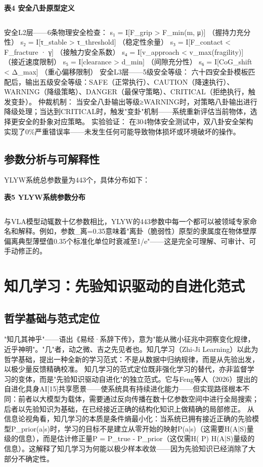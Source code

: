 \documentclass[12pt,a4paper]{article}
\begin{document}
\begin{center}
\textbf{表4  安全八卦原型定义}
\begin{tabular}{lcccc}
\hline
\end{tabular}
\end{center}
安全L2层——6条物理安全检查：
s₁ = I[F\_grip > F\_min(m, μ)]  （握持力充分性）
s₂ = I[τ\_stable > τ\_threshold]  （稳定性余量）
s₃ = I[F\_contact < F\_fracture · γ]  （接触力安全系数）
s₄ = I[v\_approach < v\_max(fragility)]  （接近速度限制）
s₅ = I[clearance > d\_min]  （间隙充分性）
s₆ = I[CoG\_shift < Δ\_max]  （重心偏移限制）
安全L3层——5级安全等级：
六十四安全卦模板匹配后，输出五级安全等级：SAFE（正常执行）、CAUTION（降速执行）、WARNING（降级策略）、DANGER（最保守策略）、CRITICAL（拒绝执行，触发变卦）。
仲裁机制： 当安全八卦输出等级≥WARNING时，对策略八卦输出进行降级处理；当达到CRITICAL时，触发"变卦"机制——系统重新评估当前物体，选择更安全的卦象对应策略。
实验验证： 在304物体安全测试中，双八卦安全架构实现了0\%严重错误率——未发生任何可能导致物体损坏或环境破坏的操作。

\subsection{参数分析与可解释性}
YLYW系统总参数量为443个，具体分布如下：

\begin{center}
\textbf{表5  YLYW系统参数分布}
\begin{tabular}{lcccc}
\hline
\end{tabular}
\end{center}
与VLA模型动辄数十亿参数相比，YLYW的443参数中每一个都可以被领域专家命名和解释。例如，参数\_离=0.35意味着"离卦（脆弱性）原型的隶属度在物体壁厚偏离典型薄壁值0.35个标准化单位时衰减至1/e"——这是完全可理解、可审计、可手动修正的。

\section{知几学习：先验知识驱动的自进化范式}

\subsection{哲学基础与范式定位}
"知几其神乎"——语出《易经·系辞下传》，意为"能从微小征兆中洞察变化规律，近乎神明"。"几"者，动之微、吉之先见者也。知几学习（Zhi-Ji Learning）以此为哲学基础，提出一种全新的学习范式：不是从数据中归纳规律，而是从先验出发，以极少量反馈精确校准。
知几学习的范式定位既非强化学习的替代，亦非监督学习的变体，而是"先验知识驱动自进化"的独立范式。它与Feng等人（2026）提出的自进化具身AI[15]共享愿景——使系统具有持续进化能力——但实现路径根本不同：前者以大模型为载体，需要通过反向传播在数十亿参数空间中进行全局搜索；后者以先验知识为基础，在已经接近正确的结构化知识上做精确的局部修正。
从信息论视角看，知几学习的本质是条件熵最小化：当系统已拥有接近正确的先验模型P\_prior(a|s)时，学习的目标不是建立从零开始的映射P(a|s)（这需要H(A|S)量级的信息），而是估计修正量P = P\_true - P\_prior（这仅需H( P)  H(A|S)量级的信息）。这解释了知几学习为何能以极少样本收敛——因为先验知识已经消除了大部分不确定性。
\end{document}
